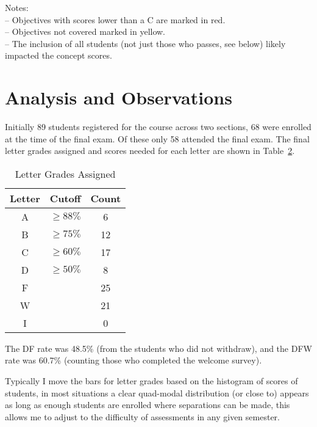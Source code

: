 \documentclass[11pt]{article}
\begin{document}
\begin{table}
{\begin{tabular}{lcc|cccccccc|}
\end{tabular}
}

{\raggedright Notes:\\
-- Objectives with scores lower than a C are marked in red.\\
-- Objectives not covered marked in yellow. \\
-- The inclusion of all students (not just those who passes, see below) likely impacted the concept scores. \par}
\label{tab:HW}
\end{table}


\section{Analysis and Observations}
\label{sec:analysis} 
Initially 89 students registered for the course across two sections, 68 were enrolled at the time of the final exam. 
Of these only 58 attended the final exam. 
The final letter grades  assigned and scores needed for each letter are shown in Table~\ref{tab:letter}.\\
\begin{table}
\caption{Letter Grades Assigned}
\label{tab:letter}
\begin{center}
\begin{tabular}{|c|c|c|}
\hline
Letter & Cutoff & Count\\
\hline\hline
A	& $\ge88\%$ & 6\\
\hline
B	& $\ge75\% $& 12\\
\hline
C	& $\ge60\%$ & 17\\
\hline
D	& $\ge50\%$ & 8\\
\hline
F	&& 25\\
\hline
W 	&& 21\\
\hline
I	&& 0\\
\hline
\end{tabular}
\end{center}%
\end{table}


The DF rate was 48.5\% (from the students who did not withdraw), and the DFW rate was 60.7\% (counting those who completed the welcome survey). 

Typically I move the bars for letter grades based on the histogram of scores of students, in most situations a clear quad-modal distribution (or close to) appears as long as enough students are enrolled where separations can be made, this allows me to adjust to the difficulty of assessments in any given semester. 
\end{document}
